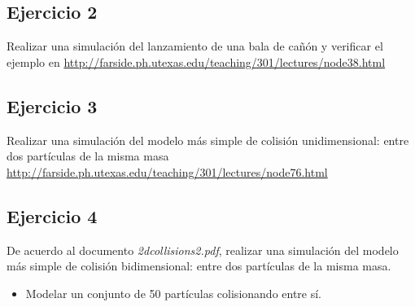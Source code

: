 \documentclass[a4paper]{article}
\begin{document}
\subsection{Ejercicio 2}

Realizar una simulación del lanzamiento de una bala de cañón y 
verificar el ejemplo en \url{http://farside.ph.utexas.edu/teaching/301/lectures/node38.html}

\subsection{Ejercicio 3}

Realizar una simulación del modelo más simple de colisión 
unidimensional: entre dos partículas de la misma masa \url{http://farside.ph.utexas.edu/teaching/301/lectures/node76.html}

\subsection{Ejercicio 4}

De acuerdo al documento \emph{2dcollisions2.pdf}, realizar una 
simulación del modelo más simple de colisión bidimensional: entre 
dos partículas de la misma masa.

\begin{itemize}
	\item Modelar un conjunto de 50 partículas colisionando entre sí.
\end{itemize}
\end{document}
